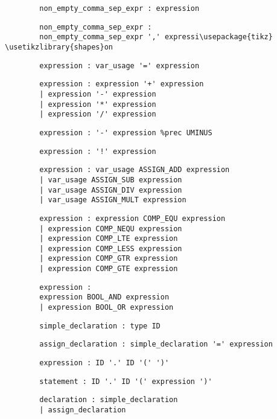 \documentclass[10pt,landscape]{article}
\begin{document}
\begin{multicols}{3}
\begin{verbatim}
		non_empty_comma_sep_expr : expression
		\end{verbatim}
		\begin{verbatim}
		non_empty_comma_sep_expr :
		non_empty_comma_sep_expr ',' expressi\usepackage{tikz}
\usetikzlibrary{shapes}on
		\end{verbatim}
		\begin{verbatim}
		expression : var_usage '=' expression
		\end{verbatim}
		\begin{verbatim}
		expression : expression '+' expression
		| expression '-' expression
		| expression '*' expression
		| expression '/' expression
		\end{verbatim}
		\begin{verbatim}
		expression : '-' expression %prec UMINUS
		\end{verbatim}
		\begin{verbatim}
		expression : '!' expression
		\end{verbatim}
		\begin{verbatim}
		expression : var_usage ASSIGN_ADD expression
		| var_usage ASSIGN_SUB expression
		| var_usage ASSIGN_DIV expression
		| var_usage ASSIGN_MULT expression
		\end{verbatim}
		\begin{verbatim}
		expression : expression COMP_EQU expression
		| expression COMP_NEQU expression
		| expression COMP_LTE expression
		| expression COMP_LESS expression
		| expression COMP_GTR expression
		| expression COMP_GTE expression
		\end{verbatim}
		\begin{verbatim}
		expression : 
		expression BOOL_AND expression
		| expression BOOL_OR expression
		\end{verbatim}
		\begin{verbatim}
		simple_declaration : type ID
		\end{verbatim}
		\begin{verbatim}
		assign_declaration : simple_declaration '=' expression
		\end{verbatim}
		\begin{verbatim}
		expression : ID '.' ID '(' ')'
		\end{verbatim}
		\begin{verbatim}
		statement : ID '.' ID '(' expression ')'
		\end{verbatim}
		\begin{verbatim}
		declaration : simple_declaration
		| assign_declaration
		\end{verbatim}

\end{multicols}
\end{document}

